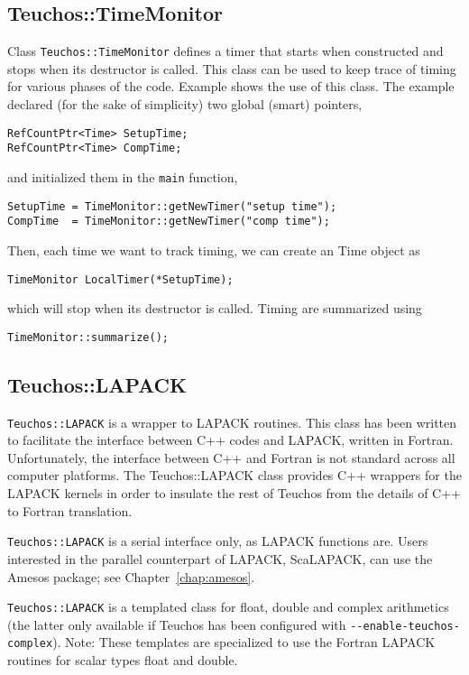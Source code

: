 
\subsection{Teuchos::TimeMonitor}
\label{sec:teuchos:TimeMonitor}

Class \verb!Teuchos::TimeMonitor! defines a timer that starts when
constructed and stops when its destructor is called. This class can be
used to keep trace of timing for various phases of the code. Example
 shows the use of this class. The example
declared (for the sake of simplicity) two global (smart) pointers,
\begin{verbatim}
RefCountPtr<Time> SetupTime;
RefCountPtr<Time> CompTime;
\end{verbatim}
and initialized them in the \verb!main! function,
\begin{verbatim}
SetupTime = TimeMonitor::getNewTimer("setup time");
CompTime  = TimeMonitor::getNewTimer("comp time");
\end{verbatim}
Then, each time we want to track timing, we can create an Time object as
\begin{verbatim}
TimeMonitor LocalTimer(*SetupTime);
\end{verbatim}
which will stop when its destructor is called. Timing are summarized
using
\begin{verbatim}
TimeMonitor::summarize();
\end{verbatim}


\subsection{Teuchos::LAPACK}
\label{sec:teuchos:LAPACK}

\verb!Teuchos::LAPACK! is a wrapper to LAPACK routines. This class has
been written to facilitate the interface between C++ codes and LAPACK,
written in Fortran. Unfortunately, the interface between C++ and Fortran
is not standard across all computer platforms. The Teuchos::LAPACK class
provides C++ wrappers for the LAPACK kernels in order to insulate the
rest of Teuchos from the details of C++ to Fortran translation.

\verb!Teuchos::LAPACK! is a serial interface only, as LAPACK functions
are. Users interested in the parallel counterpart of LAPACK, ScaLAPACK,
can use the Amesos package; see Chapter~\ref{chap:amesos}.

\verb!Teuchos::LAPACK! is a templated class for float, double and
complex arithmetics (the latter only available if Teuchos has been
configured with \verb!--enable-teuchos-complex!).  Note: These templates
are specialized to use the Fortran LAPACK routines for scalar types
float and double.

